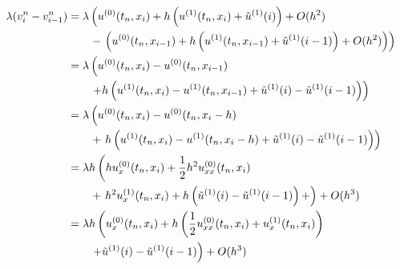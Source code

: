 \begin{align*}
\lambda (v^n_{i} - v^n_{i-1})
&= \lambda \left( u^{(0)}(t_n, x_i) + h \left( u^{(1)}(t_n, x_i) + \tilde u^{(1)}(i) \right) + O(h^2) \right.\\
   &\qquad -  \left. \left( u^{(0)}(t_n, x_{i-1}) + h \left( u^{(1)}(t_n, x_{i-1}) + \tilde u^{(1)}(i-1)\right)  + O(h^2) \right) \right)\\
&= \lambda \left( u^{(0)}(t_n, x_i) - u^{(0)}(t_n, x_{i-1}) \right. \\
   &\qquad \left. + h \left( u^{(1)}(t_n, x_i) - u^{(1)}(t_n, x_{i-1}) + \tilde u^{(1)}(i) - \tilde u^{(1)}(i-1) \right) \right)\\
&= \lambda \left( u^{(0)}(t_n, x_i) - u^{(0)}(t_n, x_i - h) \right. \\
   &\qquad + \left. h \left( u^{(1)}(t_n, x_i) - u^{(1)}(t_n, x_i - h) + \tilde u^{(1)}(i) - \tilde u^{(1)}(i-1) \right) \right)\\
&= \lambda h \left( h u^{(0)}_x(t_n, x_i) + \frac 12 h^2 u^{(0)}_{xx}(t_n, x_i) \right. \\
   &\qquad + \left. h^2 u^{(1)}_x(t_n, x_i) + h\left( \tilde u^{(1)}(i) - \tilde u^{(1)}(i-1) \right) + \right) + O(h^3) \\
&= \lambda h \left( u^{(0)}_x(t_n, x_i) + h \left(\frac 12 u^{(0)}_{xx}(t_n, x_i) + u^{(1)}_x(t_n, x_i) \right) \right. \\
   &\qquad \left. + \tilde u^{(1)}(i) - \tilde u^{(1)}(i-1) \right) + O(h^3) \\
\end{align*}